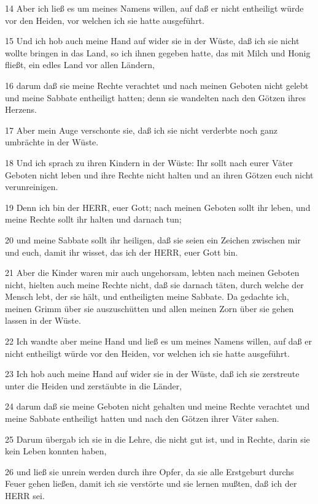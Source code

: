 \par 14 Aber ich ließ es um meines Namens willen, auf daß er nicht entheiligt würde vor den Heiden, vor welchen ich sie hatte ausgeführt.
\par 15 Und ich hob auch meine Hand auf wider sie in der Wüste, daß ich sie nicht wollte bringen in das Land, so ich ihnen gegeben hatte, das mit Milch und Honig fließt, ein edles Land vor allen Ländern,
\par 16 darum daß sie meine Rechte verachtet und nach meinen Geboten nicht gelebt und meine Sabbate entheiligt hatten; denn sie wandelten nach den Götzen ihres Herzens.
\par 17 Aber mein Auge verschonte sie, daß ich sie nicht verderbte noch ganz umbrächte in der Wüste.
\par 18 Und ich sprach zu ihren Kindern in der Wüste: Ihr sollt nach eurer Väter Geboten nicht leben und ihre Rechte nicht halten und an ihren Götzen euch nicht verunreinigen.
\par 19 Denn ich bin der HERR, euer Gott; nach meinen Geboten sollt ihr leben, und meine Rechte sollt ihr halten und darnach tun;
\par 20 und meine Sabbate sollt ihr heiligen, daß sie seien ein Zeichen zwischen mir und euch, damit ihr wisset, das ich der HERR, euer Gott bin.
\par 21 Aber die Kinder waren mir auch ungehorsam, lebten nach meinen Geboten nicht, hielten auch meine Rechte nicht, daß sie darnach täten, durch welche der Mensch lebt, der sie hält, und entheiligten meine Sabbate. Da gedachte ich, meinen Grimm über sie auszuschütten und allen meinen Zorn über sie gehen lassen in der Wüste.
\par 22 Ich wandte aber meine Hand und ließ es um meines Namens willen, auf daß er nicht entheiligt würde vor den Heiden, vor welchen ich sie hatte ausgeführt.
\par 23 Ich hob auch meine Hand auf wider sie in der Wüste, daß ich sie zerstreute unter die Heiden und zerstäubte in die Länder,
\par 24 darum daß sie meine Geboten nicht gehalten und meine Rechte verachtet und meine Sabbate entheiligt hatten und nach den Götzen ihrer Väter sahen.
\par 25 Darum übergab ich sie in die Lehre, die nicht gut ist, und in Rechte, darin sie kein Leben konnten haben,
\par 26 und ließ sie unrein werden durch ihre Opfer, da sie alle Erstgeburt durchs Feuer gehen ließen, damit ich sie verstörte und sie lernen mußten, daß ich der HERR sei.
